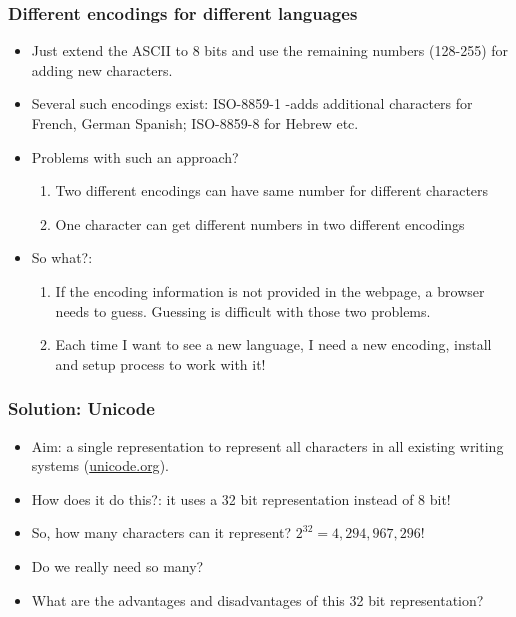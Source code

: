 \documentclass{beamer}
\begin{document}
\begin{frame}
\frametitle{Different encodings for different languages}
\begin{itemize}
\item Just extend the ASCII to 8 bits and use the remaining numbers (128-255) for adding new characters.
\item Several such encodings exist: ISO-8859-1 -adds additional characters for French, German Spanish; ISO-8859-8 for Hebrew etc. \pause
\item Problems with such an approach? \pause
\begin{enumerate}
\item Two different encodings can have same number for different characters
\item One character can get different numbers in two different encodings
\end{enumerate}
\item So what?: \pause
\begin{enumerate}
\item If the encoding information is not provided in the webpage, a browser needs to guess. Guessing is difficult with those two problems.
\item Each time I want to see a new language, I need a new encoding, install and setup process to work with it!
\end{enumerate}
\end{itemize}
\end{frame}

\begin{frame}
\frametitle{Solution: Unicode}
\begin{itemize}
\item Aim: a single representation to represent all characters in all existing writing systems (\url{unicode.org}). \pause
\item How does it do this?: it uses a 32 bit representation instead of 8 bit!
\item So, how many characters can it represent? \pause $2^{32} = 4,294,967,296$! 
\item Do we really need so many?
\item What are the advantages and disadvantages of this 32 bit representation?
\end{itemize}
\end{frame}
\end{document}

